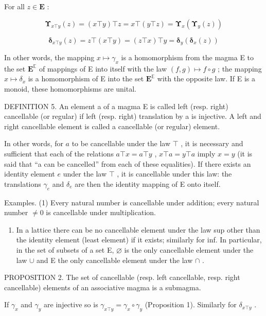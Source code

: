 For all \(z \in \mathbf{E}\) :

\[
\boldsymbol {\Upsilon} _ {x \top y} (z) = (x \top y) \top z = x \top (y \top z) = \boldsymbol {\Upsilon} _ {x} (\boldsymbol {\Upsilon} _ {y} (z))
\]

\[
\boldsymbol {\delta} _ {x \top y} (z) = z \top (x \top y) = (z \top x) \top y = \boldsymbol {\delta} _ {y} (\boldsymbol {\delta} _ {x} (z))
\]

In other words, the mapping \(x \mapsto \gamma_x\) is a homomorphism from the magma E to the set \(\mathbf{E}^{\mathbb{E}}\) of mappings of E into itself with the law \((f, g) \mapsto f \circ g\) ; the mapping \(x \mapsto \delta_x\) is a homomorphism of E into the set \(\mathbf{E}^{\mathbb{E}}\) with the opposite law. If E is a monoid, these homomorphisms are unital.

DEFINITION 5. An element a of a magma E is called left (resp. right) cancellable (or regular) if left (resp. right) translation by a is injective. A left and right cancellable element is called a cancellable (or regular) element.

In other words, for \(a\) to be cancellable under the law \(\top\) , it is necessary and sufficient that each of the relations \(a \top x = a \top y\) , \(x \top a = y \top a\) imply \(x = y\) (it is said that ``a can be cancelled'' from each of these equalities). If there exists an identity element \(e\) under the law \(\top\) , it is cancellable under this law: the translations \(\gamma_e\) and \(\delta_e\) are then the identity mapping of E onto itself.

Examples. (1) Every natural number is cancellable under addition; every natural number \(\neq 0\) is cancellable under multiplication.

\begin{enumerate}
\def\labelenumi{(\arabic{enumi})}
\setcounter{enumi}{1}
\tightlist
\item
  In a lattice there can be no cancellable element under the law sup other than the identity element (least element) if it exists; similarly for inf. In particular, in the set of subsets of a set E, \(\varnothing\) is the only cancellable element under the law \(\cup\) and E the only cancellable element under the law \(\cap\) .
\end{enumerate}

PROPOSITION 2. The set of cancellable (resp. left cancellable, resp. right cancellable) elements of an associative magma is a submagma.

If \(\gamma_{x}\) and \(\gamma_{y}\) are injective so is \(\gamma_{x\top y} = \gamma_{x}\circ \gamma_{y}\) (Proposition 1). Similarly for \(\delta_{x\top y}\) .

